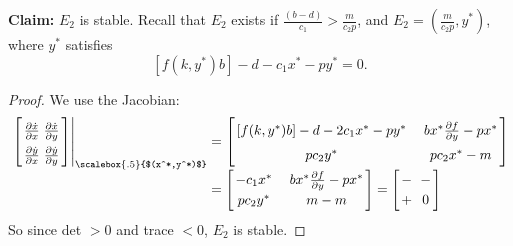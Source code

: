 \documentclass{beamer}
\newcommand{\del}{\partial}
\begin{document}
\begin{frame}[t]
\textbf{Claim:} $E_2$ is stable. Recall that $E_2$ exists if  $\frac{(b-d)}{c_1}>\frac{m}{c_2p}$, and $E_2=\left(\frac{m}{c_2p}, y^*\right)$, where $y^*$ satisfies 
$$[f(k,y^*)b]-d-c_1x^*-py^*=0.$$
\begin{proof}
We use the Jacobian:
\[
\arraycolsep=1.4pt\def\arraystretch{1.5}
\begin{array}{rcl}
	\left.\left[\arraycolsep=1.4pt\def\arraystretch{1.5}
	\begin{array}{cc}
		\frac{\del \dot{x}}{\del x} & \frac{\del \dot{x}}{\del y}\\
		\frac{\del \dot{y}}{\del x} & \frac{\del \dot{y}}{\del y}\\
	\end{array}\right]\right|_{\scalebox{.5}{$(x^*,y^*)$}}
	&=&
	\left[\arraycolsep=1.4pt\def\arraystretch{1.5}
	\begin{array}{cc}
		[f(k,y^*)b]-d-2c_1x^*-py^* & \quad bx^*\frac{\del f}{\del y}-px^*\\
		pc_2y^* & \quad pc_2x^*-m\\
	\end{array}\right]
	\\
	&=&	
	\left[\arraycolsep=1.4pt\def\arraystretch{1.2}
	\begin{array}{cc}
		-c_1x^* &  \quad bx^*\frac{\del f}{\del y}-px^*\\
		pc_2y^* & \quad m-m\\
	\end{array}\right]
	=
	\left[\arraycolsep=1.4pt\def\arraystretch{1.2}
	\begin{array}{cc}
		- & \,\,-\\
		+ & \,\,0\\
	\end{array}\right]		
\end{array}	
\]
So since det $>0$ and trace $<0$, $E_2$ is stable. 
\end{proof}
\end{frame}
\end{document}
